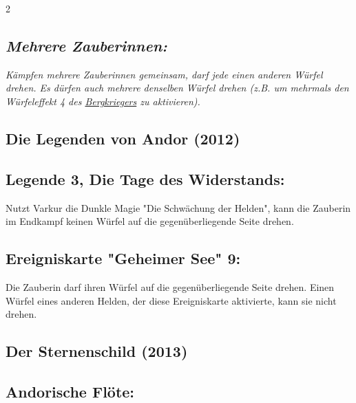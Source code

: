 \documentclass[10pt, a4paper, oneside]{book}
\newcommand{\fan}[1]{\textit{#1}}
\begin{document}
\begin{multicols*}{2}
\begin{nobgcolor}
\subsection{\fan{Mehrere Zauberinnen:}}

\fan{Kämpfen mehrere Zauberinnen gemeinsam, darf jede einen anderen Würfel drehen. Es dürfen auch mehrere denselben Würfel drehen (z.B. um mehrmals den Würfeleffekt 4 des \hyperref[bergkrieger]{Bergkriegers} zu aktivieren).}

\end{nobgcolor}




\begin{bgcolor}

\section{Die Legenden von Andor (2012)}


\subsection{Legende 3, Die Tage des Widerstands:}

Nutzt Varkur die Dunkle Magie "Die Schwächung der Helden", kann die Zauberin im Endkampf keinen Würfel auf die gegenüberliegende Seite drehen.
\supercite{dlva3-die-schwaechung-der-helden}


\subsection{Ereigniskarte "Geheimer See" 9:}

Die Zauberin darf ihren Würfel auf die gegenüberliegende Seite drehen.
\supercite{dlva-ereigniskarte-geheimer-see-9}
Einen Würfel eines anderen Helden, der diese Ereigniskarte aktivierte, kann sie nicht drehen.


\end{bgcolor}



\columnbreak


\begin{bgcolor}
\section{Der Sternenschild (2013)}


\subsection{Andorische Flöte:}


\end{bgcolor}
\end{multicols*}
\end{document}
